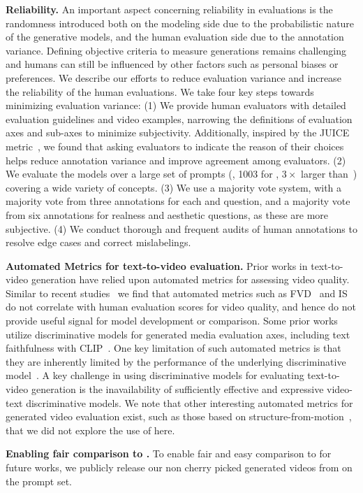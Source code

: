 \noindent \textbf{Reliability.}
An important aspect concerning reliability in evaluations is the randomness introduced both on the modeling side due to the probabilistic nature of the generative models, and the human evaluation side due to the annotation variance.
Defining objective criteria to measure generations remains challenging and humans can still be influenced by other factors such as personal biases or preferences.
We describe our efforts to reduce evaluation variance and increase the reliability of the human evaluations.
We take four key steps towards minimizing evaluation variance:
(1) We provide human evaluators with detailed evaluation guidelines and video examples, narrowing the definitions of evaluation axes and sub-axes to minimize subjectivity.
Additionally, inspired by the JUICE metric~\citep{emuvideo2023}, we found that asking evaluators to indicate the reason of their choices helps reduce annotation variance and improve agreement among evaluators.
(2) We evaluate the models over a large set of prompts (\eg, 1003 for \textToVBenchmarkName, $3\times$ larger than~\citep{singer2023makeavideo,emuvideo2023}) covering a wide variety of concepts.
(3) We use a majority vote system, with a majority vote from three annotations for each \faithfulnessFull and \qualityFull question, and a majority vote from six annotations for realness and aesthetic questions, as these are more subjective.
(4) We conduct thorough and frequent audits of human annotations to resolve edge cases and correct mislabelings.

\noindent \textbf{Automated Metrics for text-to-video evaluation.}
Prior works in text-to-video generation have relied upon automated metrics for assessing video quality.
Similar to recent studies~\citep{dai2023emu,podell2023sdxl,singer2023makeavideo,emuvideo2023,ho2022imagen,barratt2018note,chong2020effectively,ge2024content,huang2023vbench} we find that automated metrics such as FVD~\citep{unterthiner2019fvd} and IS~\citep{salimans2016improved} do not correlate with human evaluation scores for video quality, and hence do not provide useful signal for model development or comparison.
Some prior works utilize discriminative models for generated media evaluation axes, including text faithfulness with CLIP~\citep{radford2021learning}.
One key limitation of such automated metrics is that they are inherently limited by the performance of the underlying discriminative model~\citep{rambhatla2023selfevalleveragingdiscriminativenature}.
A key challenge in using discriminative models for evaluating text-to-video generation is the inavailability of sufficiently effective and expressive video-text discriminative models.
We note that other interesting automated metrics for generated video evaluation exist, such as those based on structure-from-motion~\citep{Li2024SoraGV}, that we did not explore the use of here.


\noindent \textbf{Enabling fair comparison to \OursVideo.} To enable fair and easy comparison to \OursVideo for future works, we publicly release our non cherry picked generated videos from \OursVideo on the \textToVBenchmarkName prompt set.
